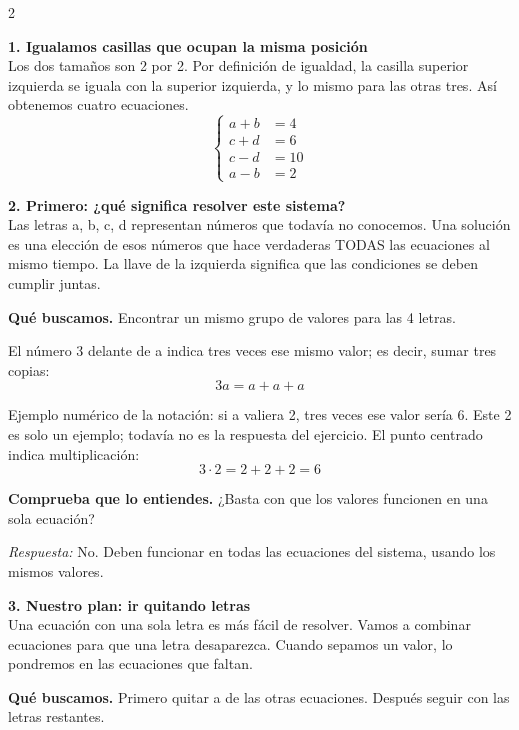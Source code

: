 \documentclass[11pt,a4paper,landscape]{article}
\begin{document}
\begin{multicols*}{2}
\noindent\begin{minipage}{\linewidth}\textbf{1. Igualamos casillas que ocupan la misma posición}\\[2pt]Los dos tamaños son 2 por 2. Por definición de igualdad, la casilla superior izquierda se iguala con la superior izquierda, y lo mismo para las otras tres. Así obtenemos cuatro ecuaciones.
\[\left\{\begin{aligned}a+b&=4\\c+d&=6\\c-d&=10\\a-b&=2\end{aligned}\right.\]
\end{minipage}\par\medskip
\noindent\begin{minipage}{\linewidth}\textbf{2. Primero: ¿qué significa resolver este sistema?}\\[2pt]Las letras a, b, c, d representan números que todavía no conocemos. Una solución es una elección de esos números que hace verdaderas TODAS las ecuaciones al mismo tiempo. La llave de la izquierda significa que las condiciones se deben cumplir juntas.
\par\smallskip\textbf{Qué buscamos.} Encontrar un mismo grupo de valores para las 4 letras.
\par\smallskip El número 3 delante de a indica tres veces ese mismo valor; es decir, sumar tres copias:
\[3a=a+a+a\]
\par\smallskip Ejemplo numérico de la notación: si a valiera 2, tres veces ese valor sería 6. Este 2 es solo un ejemplo; todavía no es la respuesta del ejercicio. El punto centrado indica multiplicación:
\[3\cdot 2=2+2+2=6\]
\par\smallskip\textbf{Comprueba que lo entiendes.} ¿Basta con que los valores funcionen en una sola ecuación?\par\textit{Respuesta:} No. Deben funcionar en todas las ecuaciones del sistema, usando los mismos valores.
\end{minipage}\par\medskip
\noindent\begin{minipage}{\linewidth}\textbf{3. Nuestro plan: ir quitando letras}\\[2pt]Una ecuación con una sola letra es más fácil de resolver. Vamos a combinar ecuaciones para que una letra desaparezca. Cuando sepamos un valor, lo pondremos en las ecuaciones que faltan.
\par\smallskip\textbf{Qué buscamos.} Primero quitar a de las otras ecuaciones. Después seguir con las letras restantes.

\end{minipage}
\end{multicols*}
\end{document}
